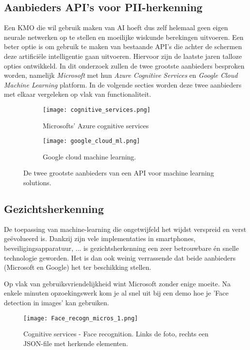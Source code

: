 \subsection{Aanbieders API's voor PII-herkenning}
Een KMO die wil gebruik maken van AI hoeft dus zelf helemaal geen eigen neurale netwerken op te stellen en moeilijke wiskunde berekingen uitvoeren. Een beter optie is om gebruik te maken van bestaande API's die achter de schermen deze artificiële intelligentie gaan uitvoeren. Hiervoor zijn de laatste jaren talloze opties ontwikkeld. In dit onderzoek zullen de twee grootste aanbieders besproken worden, namelijk \textit{Microsoft} met hun \textit{Azure Cognitive Services} en  \textit{Google Cloud Machine Learning} platform. In de volgende secties worden deze twee aanbieders met elkaar vergeleken op vlak van functionaliteit.
\begin{figure}[h]
    \centering
    \begin{subfigure}{0.5\textwidth}
        \centering
        \texttt{[image: cognitive\_services.png]}
        \caption{Microsofts' Azure cognitive services}
        \label{fig:sub1}
    \end{subfigure}%
    \begin{subfigure}{0.5\textwidth}
        \centering
        \texttt{[image: google\_cloud\_ml.png]}
        \caption{Google cloud machine learning.}
        \label{fig:sub2}
    \end{subfigure}
    \caption{De twee grootste aanbieders van een API voor machine learning solutions.}
    \label{fig:test}
\end{figure}

\subsection{Gezichtsherkenning}
De toepassing van machine-learning die ongetwijfeld het wijdst verspreid en verst geëvolueerd is. Dankzij zijn vele implementaties in smartphones, beveiligingsapparatuur, ... is gezichtsherkenning een zeer betrouwbare én snelle technologie geworden. Het is dan ook weinig verrassende dat beide aanbieders (Microsoft en Google) het ter beschikking stellen. 

Op vlak van gebruiksvriendelijkheid wint Microsoft zonder enige moeite. Na enkele minuten opzoekingswerk kom je al snel uit bij een demo hoe je 'Face detection in images' kan gebruiken. 


\begin{figure}[h]
    \texttt{[image: Face\_recogn\_micros\_1.png]}
    \caption{Cognitive services - Face recognition. Links de foto, rechts een JSON-file met herkende elementen.}
    \label{fig:cognitive}
\end{figure}

